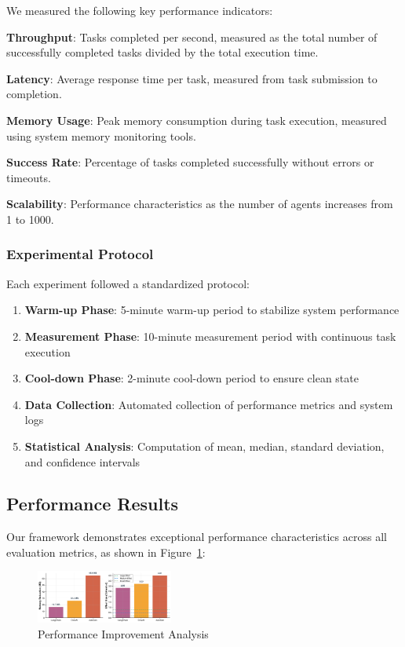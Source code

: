 \documentclass[conference]{IEEEtran}
\begin{document}
We measured the following key performance indicators:

\textbf{Throughput}: Tasks completed per second, measured as the total number of successfully completed tasks divided by the total execution time.

\textbf{Latency}: Average response time per task, measured from task submission to completion.

\textbf{Memory Usage}: Peak memory consumption during task execution, measured using system memory monitoring tools.

\textbf{Success Rate}: Percentage of tasks completed successfully without errors or timeouts.

\textbf{Scalability}: Performance characteristics as the number of agents increases from 1 to 1000.

\subsubsection{Experimental Protocol}

Each experiment followed a standardized protocol:

\begin{enumerate}
\item \textbf{Warm-up Phase}: 5-minute warm-up period to stabilize system performance
\item \textbf{Measurement Phase}: 10-minute measurement period with continuous task execution
\item \textbf{Cool-down Phase}: 2-minute cool-down period to ensure clean state
\item \textbf{Data Collection}: Automated collection of performance metrics and system logs
\item \textbf{Statistical Analysis}: Computation of mean, median, standard deviation, and confidence intervals
\end{enumerate}

\subsection{Performance Results}

Our framework demonstrates exceptional performance characteristics across all evaluation metrics, as shown in Figure~\ref{fig:performance}:

\begin{figure}[htbp]
\centering
\includegraphics[width=0.4\textwidth]{images/performance_improvement.png}
\caption{Performance Improvement Analysis}
\label{fig:performance}
\end{figure}
\end{document}
